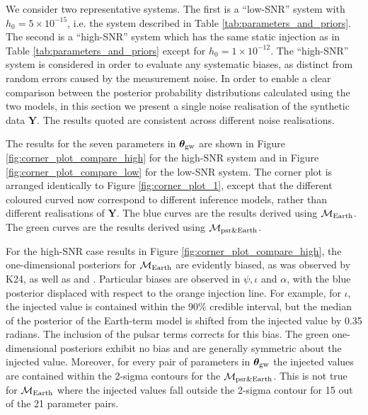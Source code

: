 \documentclass[fleqn,usenatbib,useAMS]{mnras}
\begin{document}
We consider two representative systems. The first is a ``low-SNR'' system with $h_0 = 5 \times 10^{-15}$, i.e. the system described in Table \ref{tab:parameters_and_priors}. The second is a ``high-SNR'' system which has the same static injection as in Table \ref{tab:parameters_and_priors} except for $h_0 = 1 \times 10^{-12}$. The ``high-SNR'' system is considered in order to evaluate any systematic biases, as distinct from random errors caused by the measurement noise. In order to enable a clear comparison between the posterior probability distributions calculated using the two models, in this section we present a single noise realisation of the synthetic data $\boldsymbol{Y}$. The results quoted are consistent across different noise realisations. \newline 


The results for the seven parameters in $\boldsymbol{\theta}_{\rm gw}$ are shown in Figure \ref{fig:corner_plot_compare_high} for the high-SNR system and in Figure \ref{fig:corner_plot_compare_low} for the low-SNR system. The corner plot is arranged identically to Figure \ref{fig:corner_plot_1}, except that the different coloured curved now correspond to different inference models, rather than different realisations of $\boldsymbol{Y}$. The blue curves are the results derived using $\mathcal{M}_{\rm Earth}$. The green curves are the results derived using $\mathcal{M}_{\rm psr \& Earth}$. \newline 
		
For the high-SNR case results in Figure \ref{fig:corner_plot_compare_high}, the one-dimensional posteriors for $\mathcal{M}_{\rm Earth}$ are evidently biased, as was observed by K24, as well as \cite{Zhupulsarterms} and \cite{Chen2022}. Particular biases are observed in $\psi, \iota $ and $\alpha$, with the blue posterior displaced with respect to the orange injection line. For example, for $\iota$, the injected value is contained within the 90\% credible interval, but the median of the posterior of the Earth-term model is shifted from the injected value by 0.35 radians. The inclusion of the pulsar terms corrects for this bias. The green one-dimensional posteriors exhibit no bias and are generally symmetric about the injected value. Moreover, for every pair of parameters in ${\boldsymbol{\theta}}_{\rm gw}$ the injected values are contained within the 2-sigma contours for the $\mathcal{M}_{\rm psr \& Earth}$. This is not true for $\mathcal{M}_{\rm Earth}$ where the injected values fall outside the 2-sigma contour for 15 out of the 21 parameter pairs.\newline 
\end{document}
